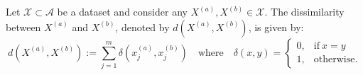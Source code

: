 \begin{definition}\label{def:dissim}
    Let \(\mathcal{X} \subset \mathcal A\) be a dataset and consider any
    \(X^{(a)}, X^{(b)} \in \mathcal{X}\). The dissimilarity between \(X^{(a)}\)
    and \(X^{(b)}\), denoted by \(d\left(X^{(a)}, X^{(b)}\right)\), is given by:
    \begin{equation}\label{eq:dissim}
        d\left(X^{(a)}, X^{(b)}\right) := \sum_{j=1}^{m} \delta\left(x_j^{(a)},
        x_j^{(b)}\right) \quad \text{where} \quad \delta\left(x, y\right) =
        \begin{cases}
            0, & \text{if} \ x = y \\
            1, & \text{otherwise.}
        \end{cases}
    \end{equation}
\end{definition}

